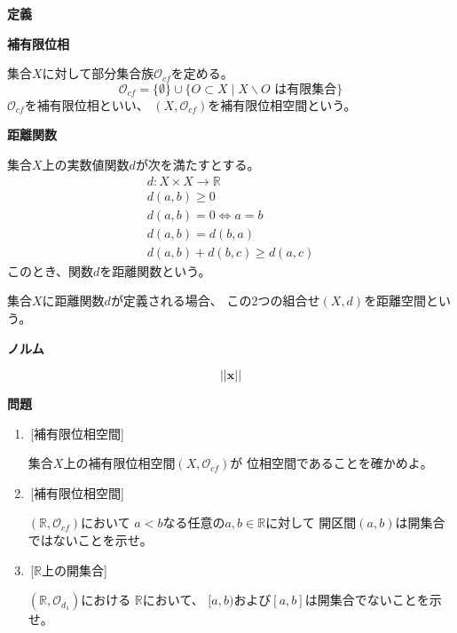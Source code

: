 \documentclass[12pt,b5paper]{ltjsarticle}
\begin{document}
\hrulefill
\textbf{定義}
\hrulefill

\textbf{補有限位相}

集合$X$に対して部分集合族$\mathcal{O}_{cf}$を定める。
\begin{equation}
 \mathcal{O}_{cf} = \{\emptyset\}\cup\{O\subset X \mid X\backslash O \text{ は有限集合}\}
\end{equation}
$\mathcal{O}_{cf}$を補有限位相といい、
$(X,\mathcal{O}_{cf})$を補有限位相空間という。


\textbf{距離関数}

集合$X$上の実数値関数$d$が次を満たすとする。
\begin{gather}
 d: X\times X \to \mathbb{R}\\
 d(a,b)\geq 0\\
 d(a,b)= 0 \Leftrightarrow a=b\\
 d(a,b) = d(b,a)\\
 d(a,b) + d(b,c) \geq d(a,c)
\end{gather}
このとき、関数$d$を距離関数という。

集合$X$に距離関数$d$が定義される場合、
この2つの組合せ$(X,d)$を距離空間という。

\textbf{ノルム}

\begin{equation}
 \lvert \lvert \bm{x} \rvert \rvert
\end{equation}


\hrulefill
\textbf{問題}
\hrulefill

\begin{enumerate}
 \item
      \,[補有限位相空間]

      集合$X$上の補有限位相空間$(X,\mathcal{O}_{cf})$が
      位相空間であることを確かめよ。

 \item
      \,[補有限位相空間]

      $(\mathbb{R},\mathcal{O}_{cf})$において
      $a<b$なる任意の$a,b\in\mathbb{R}$に対して
      開区間$(a,b)$は開集合ではないことを示せ。

 \item
      \,[$\mathbb{R}$上の開集合]

      $(\mathbb{R},\mathcal{O}_{d_1})$における
      $\mathbb{R}$において、
      $[a,b)$および$[a,b]$は開集合でないことを示せ。
\end{enumerate}
\end{document}
